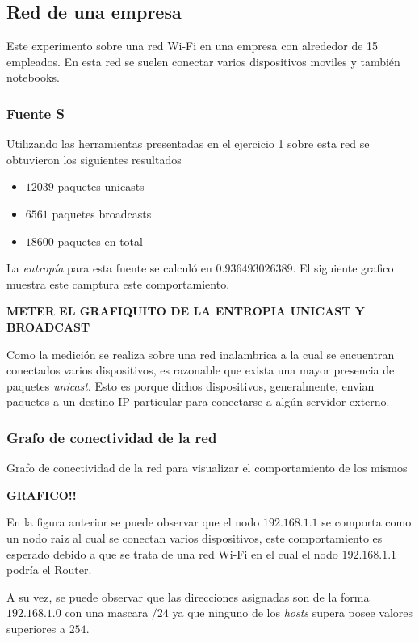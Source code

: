 
\subsection{Red de una empresa}
Este experimento sobre una red Wi-Fi en una empresa con alrededor de 15 empleados. En esta red se suelen conectar varios dispositivos moviles y también notebooks.

\subsubsection{Fuente S}

Utilizando las herramientas presentadas en el ejercicio 1 sobre esta red se obtuvieron los siguientes resultados
\begin{itemize}
 \item $12039$ paquetes unicasts
 \item $6561$ paquetes broadcasts
 \item $18600$ paquetes en total
\end{itemize}

 La \emph{entrop\'ia} para esta fuente se calcul\'o en  $0.936493026389$. El siguiente grafico muestra este camptura este comportamiento. \par
 \textbf{METER EL GRAFIQUITO DE LA ENTROPIA UNICAST Y BROADCAST}

 Como la medici\'on se realiza sobre una red inalambrica a la cual se encuentran conectados varios dispositivos, es razonable que exista una mayor presencia de paquetes \emph{unicast}. Esto es porque dichos dispositivos, generalmente, envian paquetes a un destino IP particular para conectarse a alg\'un servidor externo. \par 


 \subsubsection{Grafo de conectividad de la red}
 Grafo de conectividad de la red para visualizar el comportamiento de los mismos

 \textbf{GRAFICO!!}

 En la figura anterior se puede observar que el nodo $192.168.1.1$ se comporta como un nodo raiz al cual se conectan varios dispositivos, este comportamiento es esperado debido a que se trata de una red Wi-Fi en el cual el nodo $192.168.1.1$ podr\'ia el Router. \par 
 A su vez, se puede observar que las direcciones asignadas son de la forma $192.168.1.0$ con una mascara $/24$ ya que ninguno de los \emph{hosts} supera posee valores superiores a $254$.


